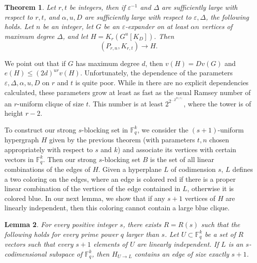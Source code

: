 \documentclass[11pt]{article}
\theoremstyle{plain}
\newtheorem{theorem}{Theorem}
\newtheorem{lemma}[theorem]{Lemma}
\theoremstyle{definition}
\begin{document}
\begin{theorem}\label{thm:two_color}
    Let $r,t$ be integers, then if $\varepsilon^{-1}$ and $\Delta$ are sufficiently large with respect to $r,t$, and $\alpha,u,D$ are sufficiently large with respect to $\varepsilon,\Delta$, the following holds. Let $n$ be an integer, let $G$ be an $\varepsilon$-expander on at least $\alpha n$ vertices of maximum degree $\Delta$, and let $H=K_r(G^u[K_D])$. Then 
    $$(P_{r,n},K_{r,t})\rightarrow H.$$
\end{theorem}
We point out that if $G$ has maximum degree $d$, then $v(H)=Dv(G)$ and $e(H)\leq (2d)^{ur} v(H)$. Unfortunately, the dependence of the parameters $\varepsilon,\Delta,\alpha,u,D$ on $r$ and $t$ is quite poor. While in \cite{LPY} there are no explicit dependencies calculated, these parameters grow at least as fast as the usual Ramsey number of an $r$-uniform clique of size $t$. This number is at least $2^{2^{\dots 2^{\Omega(t)}}}$, where the tower is of height $r-2$. 

\medskip

To construct our strong $s$-blocking set in $\mathbb{F}_q^k$, we consider the $(s+1)$-uniform hypergraph $H$ given by the previous theorem (with parameters $t,n$ chosen appropriately with respect to $s$ and $k$) and associate its vertices with certain vectors in $\mathbb{F}_q^k$. Then our strong $s$-blocking set $B$  is the set of all linear combinations of the edges of $H$. Given a hyperplane $L$ of codimension $s$, $L$ defines a two coloring on the edges, where an edge is colored red if there is a proper linear combination of the vertices of the edge contained in $L$, otherwise it is colored blue. In our next lemma, we show that if any $s+1$ vertices of $H$ are linearly independent, then this coloring cannot contain a large blue clique.

\begin{lemma}\label{lemma:exactly_s+1}
For every positive integer $s$, there exists $R=R(s)$ such that the following holds for every  prime power $q$ larger than $s$. Let $U\subset \mathbb{F}_q^k$ be a set of $R$ vectors such that every $s+1$ elements of $U$ are linearly independent.  If $L$ is an $s$-codimensional subspace of $\mathbb{F}_q^k$, then $H_{U\rightarrow L}$ contains an edge of size exactly $s+1$.
\end{lemma}
\end{document}
